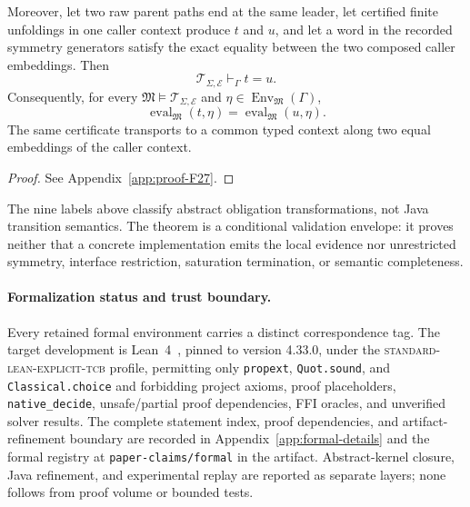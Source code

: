 \begin{theorem}
Moreover, let two raw parent paths end at the same leader, let certified
finite unfoldings in one caller context produce $t$ and $u$, and let a word
in the recorded symmetry generators satisfy the exact equality between the
two composed caller embeddings.  Then
\begin{equation}
\label{eq:derivable-soundness}
\mathcal T_{\Sigma,\mathcal E}\vdash_\Gamma t=u.
\end{equation}
Consequently, for every $\mathfrak M\models\mathcal T_{\Sigma,\mathcal E}$
and $\eta\in\operatorname{Env}_{\mathfrak M}(\Gamma)$,
\begin{equation}
\label{eq:model-soundness}
\operatorname{eval}_{\mathfrak M}(t,\eta)=
\operatorname{eval}_{\mathfrak M}(u,\eta).
\end{equation}
The same certificate transports to a common typed context along two equal
embeddings of the caller context.
\end{theorem}
\begin{proof}See Appendix~\ref{app:proof-F27}.\end{proof}

The nine labels above classify abstract obligation transformations, not Java
transition semantics.  The theorem is a conditional validation envelope: it
proves neither that a concrete implementation emits the local evidence nor
unrestricted symmetry, interface restriction, saturation termination, or
semantic completeness.

\paragraph{Formalization status and trust boundary.}
Every retained formal environment carries a distinct correspondence tag.  The
target development is Lean~4~\cite{deMouraUllrich2021Lean4}, pinned to version 4.33.0, under the
\textsc{standard-lean-explicit-tcb} profile, permitting only
\texttt{propext}, \texttt{Quot.sound}, and \texttt{Classical.choice} and
forbidding project axioms, proof placeholders, \texttt{native\_decide},
unsafe/partial proof dependencies, FFI oracles, and unverified solver results.
The complete statement index, proof dependencies, and artifact-refinement
boundary are recorded in Appendix~\ref{app:formal-details} and the 
formal registry at \texttt{paper-claims/formal} in the artifact.  Abstract-kernel closure, Java refinement, and experimental
replay are reported as separate layers; none follows from proof volume or
bounded tests.
